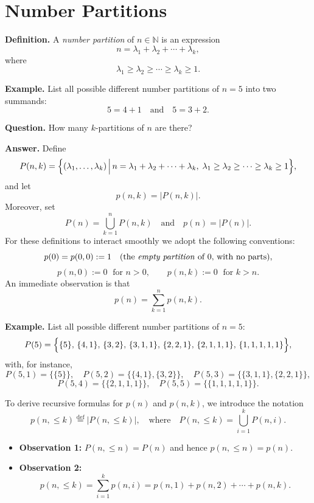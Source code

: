 \documentclass[docmute]{article}
\begin{document}
\section{Number Partitions}

\textbf{Definition.} A \emph{number partition} of \(n\in\mathbb{N}\) is an expression
\[
n = \lambda_1 + \lambda_2 + \cdots + \lambda_k,
\]
where
\[
\lambda_1 \ge \lambda_2 \ge \cdots \ge \lambda_k \ge 1.
\]

\medskip

\textbf{Example.} List all possible different number partitions of \(n=5\) into two summands:
\[
5 = 4+1 \quad \text{and} \quad 5 = 3+2.
\]

\medskip

\textbf{Question.} How many \(k\)-partitions of \(n\) are there?

\medskip

\textbf{Answer.} Define
\[
P(n,k)=\Bigl\{ (\lambda_1,\dots,\lambda_k)\,\Big|\, n=\lambda_1+\lambda_2+\cdots+\lambda_k,\; \lambda_1\ge\lambda_2\ge\cdots\ge\lambda_k\ge1 \Bigr\},
\]
and let
\[
p(n,k)=|P(n,k)|.
\]
Moreover, set
\[
P(n)=\bigcup_{k=1}^{n} P(n,k) \quad\text{and}\quad p(n)=|P(n)|.
\]
For these definitions to interact smoothly we adopt the following conventions:
\[
p(0) = p(0,0) := 1 \quad \text{(the \emph{empty partition} of } 0\text{, with no parts)},
\]
\[
p(n,0) := 0 \;\text{ for } n>0,
\qquad
p(n,k) := 0 \;\text{ for } k>n.
\]
An immediate observation is that
\[
p(n)=\sum_{k=1}^{n} p(n,k).
\]

\medskip

\textbf{Example.} List all possible different number partitions of \(n=5\):
\[
P(5)=\Bigl\{\{5\},\, \{4,1\},\, \{3,2\},\, \{3,1,1\},\, \{2,2,1\},\, \{2,1,1,1\},\, \{1,1,1,1,1\}\Bigr\},
\]
with, for instance,
\[
P(5,1)=\{ \{5\}\},\quad P(5,2)=\{\{4,1\},\{3,2\}\},\quad P(5,3)=\{\{3,1,1\},\{2,2,1\}\},
\]
\[
P(5,4)=\{\{2,1,1,1\}\},\quad P(5,5)=\{\{1,1,1,1,1\}\}.
\]

\medskip

To derive recursive formulas for \(p(n)\) and \(p(n,k)\), we introduce the notation
\[
p(n,\le k)\stackrel{\text{def}}{=} |P(n,\le k)|,\quad\text{where}\quad P(n,\le k)=\bigcup_{i=1}^{k} P(n,i).
\]
\begin{itemize}
  \item \textbf{Observation 1:} \(P(n,\le n)=P(n)\) and hence \(p(n,\le n)=p(n)\).
  \item \textbf{Observation 2:} 
  \[
  p(n,\le k)=\sum_{i=1}^{k} p(n,i)=p(n,1)+p(n,2)+\cdots+p(n,k).
  \]
\end{itemize}
\end{document}
